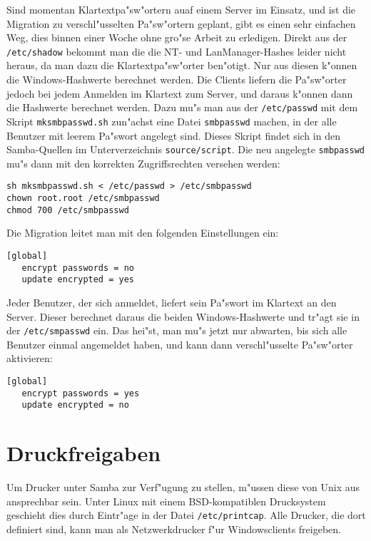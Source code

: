 \documentclass{scrartcl}\usepackage{pslatex}\typearea{12}
\newcommand{\dateistyle}{\texttt}
\begin{document}
Sind momentan Klartextpa"sw"ortern auaf einem Server im Einsatz, und
ist die Migration zu verschl"usselten Pa"sw"ortern geplant, gibt es
einen sehr einfachen Weg, dies binnen einer Woche ohne gro"se Arbeit
zu erledigen. Direkt aus der \dateistyle{/etc/shadow} bekommt man die
die NT- und LanManager-Hashes leider nicht heraus, da man dazu die
Klartextpa"sw"orter ben"otigt. Nur aus diesen k"onnen die
Windows-Hashwerte berechnet werden. Die Clients liefern die
Pa"sw"orter jedoch bei jedem Anmelden im Klartext zum Server, und
daraus k"onnen dann die Hashwerte berechnet werden. Dazu mu"s man aus
der \dateistyle{/etc/passwd} mit dem Skript
\dateistyle{mksmbpasswd.sh} zun"achst eine Datei
\dateistyle{smbpasswd} machen, in der alle Benutzer mit leerem
Pa"swort angelegt sind. Dieses Skript findet sich in den Samba-Quellen
im Unterverzeichnis \dateistyle{source/script}. Die neu angelegte
\dateistyle{smbpasswd} mu"s dann mit den korrekten Zugriffsrechten
versehen werden:

\begin{verbatim}
sh mksmbpasswd.sh < /etc/passwd > /etc/smbpasswd
chown root.root /etc/smbpasswd
chmod 700 /etc/smbpasswd
\end{verbatim}

Die Migration leitet man mit den folgenden Einstellungen ein:

\begin{verbatim}
[global]
   encrypt passwords = no
   update encrypted = yes
\end{verbatim}

Jeder Benutzer, der sich anmeldet, liefert sein Pa"swort im Klartext
an den Server. Dieser berechnet daraus die beiden Windows-Hashwerte
und tr"agt sie in der \dateistyle{/etc/smpasswd} ein. Das hei"st, man
mu"s jetzt nur abwarten, bis sich alle Benutzer einmal angemeldet
haben, und kann dann verschl"usselte Pa"sw"orter aktivieren:

\begin{verbatim}
[global]
   encrypt passwords = yes
   update encrypted = no
\end{verbatim}

\section{Druckfreigaben}

Um Drucker unter Samba zur Verf"ugung zu stellen, m"ussen diese von
Unix aus ansprechbar sein. Unter Linux mit einem BSD-kompatiblen
Drucksystem geschieht dies durch Eintr"age in der Datei
\dateistyle{/etc/printcap}. Alle Drucker, die dort definiert sind,
kann man als Netzwerkdrucker f"ur Windowsclients freigeben.
\end{document}
